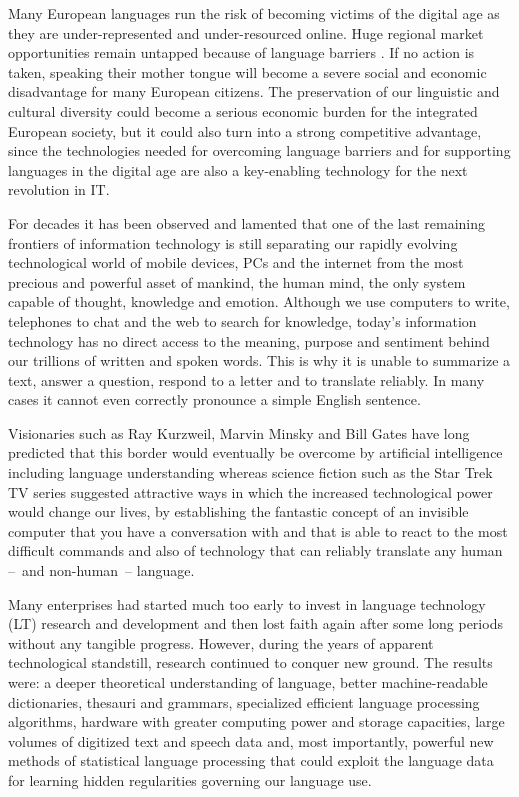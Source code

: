 \documentclass[10pt, plain]{../../metanetpaper}
\begin{document}


\begin{multicols}{2}

  Many European languages run the risk of becoming victims of the digital age as they are under-represented and under-resourced online. Huge regional market opportunities remain untapped because of language barriers \cite{EC3}. If no action is taken, speaking their mother tongue will become a severe social and economic disadvantage for many European citizens. The preservation of our linguistic and cultural diversity could become a serious economic burden for the integrated European society, but it could also turn into a strong competitive advantage, since the technologies needed for overcoming language barriers and for supporting languages in the digital age are also a key-enabling technology for the next revolution in IT.

  For decades it has been observed and lamented that one of the last remaining frontiers of information technology is still separating our rapidly evolving technological world of mobile devices, PCs and the internet from the most precious and powerful asset of mankind, the human mind, the only system capable of thought, knowledge and emotion. Although we use computers to write, telephones to chat and the web to search for knowledge, today's information technology has no direct access to the meaning, purpose and sentiment behind our trillions of written and spoken words. This is why it is unable to summarize a text, answer a question, respond to a letter and to translate reliably. In many cases it cannot even correctly pronounce a simple English sentence.

Visionaries such as Ray Kurzweil, Marvin Minsky and Bill Gates have long predicted that this border would eventually be overcome by artificial intelligence including language understanding whereas science fiction such as the Star Trek TV series suggested attractive ways in which the increased technological power would change our lives, by establishing the fantastic concept of an invisible computer that you have a conversation with and that is able to react to the most difficult commands and also of technology that can reliably translate any human --~and non-human~-- language.

Many enterprises had started much too early to invest in language technology (LT) research and development and then lost faith again after some long periods without any tangible progress. However, during the years of apparent technological standstill, research continued to conquer new ground. The results were: a deeper theoretical understanding of language, better machine-readable dictionaries, thesauri and grammars, specialized efficient language processing algorithms, hardware with greater computing power and storage capacities, large volumes of digitized text and speech data and, most importantly, powerful new methods of statistical language processing that could exploit the language data for learning hidden regularities governing our language use.


\end{multicols}
\end{document}
